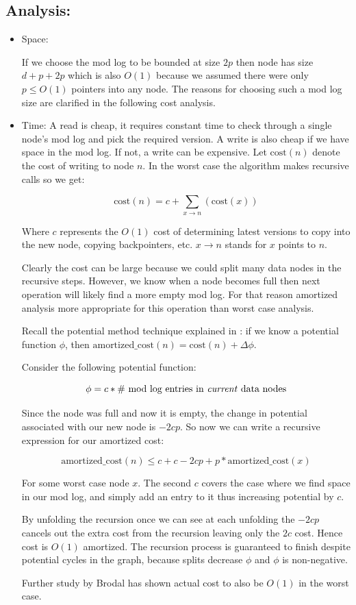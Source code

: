 \documentclass[11pt]{article}
\begin{document}
\subsection{Analysis:}

\begin{itemize}
\item Space:

If we choose the mod log to be bounded at size \(2p\) then node has size \(d + p + 2p\) which is also \(O(1)\) because we assumed there were only \(p \leq O(1)\) pointers into any node. The reasons for choosing such a mod log size are clarified in the following cost analysis.

\item Time:
A read is cheap, it requires constant time to check through a single node's mod log and pick the required version. A write is also cheap if we have space in the mod log. If not, a write can be expensive. Let $\mbox{cost}(n)$ denote the cost of writing to node $n$. In the worst case the algorithm makes recursive calls so we get:

\[\mbox{cost}(n) = c  +  \sum_{\mbox{$x \to n$}}(\mbox{cost}(x))\]

Where $c$ represents the \(O(1)\) cost of determining latest versions to copy into the new node, copying backpointers, etc. $x \to n$ stands for $x$ points to $n$. 

Clearly the cost can be large because we could split many data nodes in the recursive steps.  However, we know when a node becomes full then next operation will likely find a more empty mod log.  For that reason amortized analysis more appropriate for this operation than worst case analysis.

Recall the potential method technique explained in \cite{clrs}: if we know a potential function $\phi$, then  \(\mbox{amortized\_cost}(n) = \mbox{cost}(n) + \Delta \phi \). 

Consider the following potential function:

\[\phi = c * \mbox{\# mod log entries in \emph{current} data nodes} \]

Since the node was full and now it is empty, the change in potential associated with our new node is $-2cp$. So now we can write a recursive expression for our amortized cost: 

\[\mbox{amortized\_cost}(n) \leq c + c - 2cp + p*\mbox{amortized\_cost}(x) \]

For some worst case node $x$. The second $c$ covers the case where we find space in our mod log, and simply add an entry to it thus increasing potential by $c$.

By unfolding the recursion once we can see at each unfolding the \(-2cp\) cancels out the extra cost from the recursion leaving only the $2c$ cost. Hence cost is \(O(1)\) amortized.   The recursion process is guaranteed to finish despite potential cycles in the graph, because splits decrease $\phi$ and $\phi$ is non-negative.

Further study by Brodal \cite{brodal} has shown actual cost to also be  \(O(1)\) in the worst case.

\end{itemize}
\end{document}

